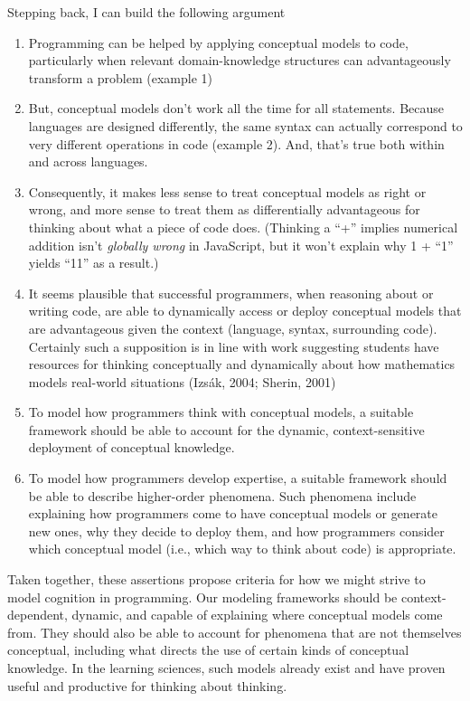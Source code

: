 Stepping back, I can build the following argument

\begin{enumerate}
\def\labelenumi{\arabic{enumi}.}
\tightlist
\item
  Programming can be helped by applying conceptual models to code,
  particularly when relevant domain-knowledge structures can
  advantageously transform a problem (example 1)
\item
  But, conceptual models don't work all the time for all statements.
  Because languages are designed differently, the same syntax can
  actually correspond to very different operations in code (example 2).
  And, that's true both within and across languages.
\item
  Consequently, it makes less sense to treat conceptual models as right
  or wrong, and more sense to treat them as differentially advantageous
  for thinking about what a piece of code does. (Thinking a ``+''
  implies numerical addition isn't \emph{globally wrong} in JavaScript,
  but it won't explain why 1 + ``1'' yields ``11'' as a result.)
\item
  It seems plausible that successful programmers, when reasoning about
  or writing code, are able to dynamically access or deploy conceptual
  models that are advantageous given the context (language, syntax,
  surrounding code). Certainly such a supposition is in line with work
  suggesting students have resources for thinking conceptually and
  dynamically about how mathematics models real-world situations (Izsák,
  2004; Sherin, 2001)
\item
  To model how programmers think with conceptual models, a suitable
  framework should be able to account for the dynamic, context-sensitive
  deployment of conceptual knowledge.
\item
  To model how programmers develop expertise, a suitable framework
  should be able to describe higher-order phenomena. Such phenomena
  include explaining how programmers come to have conceptual models or
  generate new ones, why they decide to deploy them, and how programmers
  consider which conceptual model (i.e., which way to think about code)
  is appropriate.
\end{enumerate}

Taken together, these assertions propose criteria for how we might
strive to model cognition in programming. Our modeling frameworks should
be context-dependent, dynamic, and capable of explaining where
conceptual models come from. They should also be able to account for
phenomena that are not themselves conceptual, including what directs the
use of certain kinds of conceptual knowledge. In the learning sciences,
such models already exist and have proven useful and productive for
thinking about thinking.

